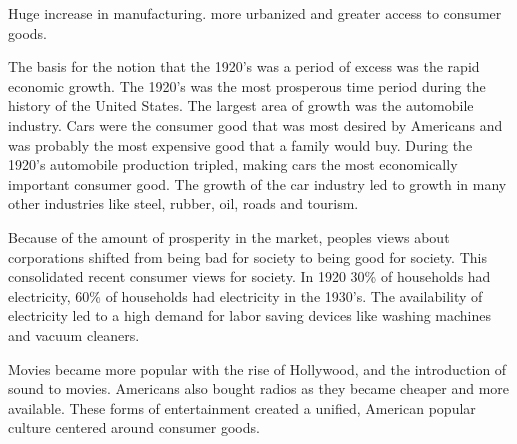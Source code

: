 Huge increase in manufacturing.
more urbanized and greater access to consumer goods.


The basis for the notion that the 1920's was a period of excess was the rapid economic growth.
The 1920's was the most prosperous time period during the history of the United States.
The largest area of growth was the automobile industry.
Cars were the consumer good that was most desired by Americans and was probably the most expensive good that a family would buy.
During the 1920's automobile production tripled, making cars the most economically important consumer good.
The growth of the car industry led to growth in many other industries like steel, rubber, oil, roads and tourism.

Because of the amount of prosperity in the market, peoples views about corporations shifted from being bad for society to being good for society.
This consolidated recent consumer views for society.
In 1920 30\% of households had electricity, 60\% of households had electricity in the 1930's.
The availability of electricity led to a high demand for labor saving devices like washing machines and vacuum cleaners.

Movies became more popular with the rise of Hollywood, and the introduction of sound to movies.
Americans also bought radios as they became cheaper and more available.
These forms of entertainment created a unified, American popular culture centered around consumer goods.